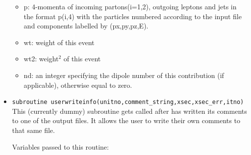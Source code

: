 \documentclass{article}
\begin{document}
\begin{itemize}
\begin{itemize}
\item        p:  4-momenta of incoming partons(i=1,2), outgoing leptons and                                                             
            jets in the format p(i,4) with the particles numbered                                                                  
            according to the input file and components labelled by                                                                 
            (px,py,pz,E).  
                                                                                                                                   
\item        wt:  weight of this event                                                                                                   
                                                                                                                                   
\item       wt2:  weight$^2$ of this event                                                                                                 
                                                                                                                                   
\item        nd:  an integer specifying the dipole number of this contribution                                                           
            (if applicable), otherwise equal to zero.
\end{itemize}

\item {\tt subroutine userwriteinfo(unitno,comment\_string,xsec,xsec\_err,itno)}
This (currently dummy) subroutine gets called after \MCFM has written its comments to
one of the output files. It allows the user to write their own comments                                                         
to that same file.
                                                                                                                                   
   Variables passed to this routine:                                                                                               
                                                                                                                                   

\end{itemize}
\end{document}
